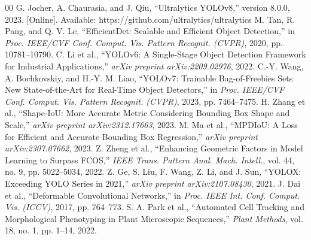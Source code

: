 \documentclass[conference]{IEEEtran}
\begin{document}
\begin{thebibliography}{00}
 G. Jocher, A. Chaurasia, and J. Qiu, ``Ultralytics YOLOv8,'' version 8.0.0, 2023. [Online]. Available: https://github.com/ultralytics/ultralytics
 M. Tan, R. Pang, and Q. V. Le, ``EfficientDet: Scalable and Efficient Object Detection,'' in \textit{Proc. IEEE/CVF Conf. Comput. Vis. Pattern Recognit. (CVPR)}, 2020, pp. 10781--10790.
 C. Li et al., ``YOLOv6: A Single-Stage Object Detection Framework for Industrial Applications,'' \textit{arXiv preprint arXiv:2209.02976}, 2022.
 C.-Y. Wang, A. Bochkovskiy, and H.-Y. M. Liao, ``YOLOv7: Trainable Bag-of-Freebies Sets New State-of-the-Art for Real-Time Object Detectors,'' in \textit{Proc. IEEE/CVF Conf. Comput. Vis. Pattern Recognit. (CVPR)}, 2023, pp. 7464--7475.
 H. Zhang et al., ``Shape-IoU: More Accurate Metric Considering Bounding Box Shape and Scale,'' \textit{arXiv preprint arXiv:2312.17663}, 2023.
 M. Ma et al., ``MPDIoU: A Loss for Efficient and Accurate Bounding Box Regression,'' \textit{arXiv preprint arXiv:2307.07662}, 2023.
 Z. Zheng et al., ``Enhancing Geometric Factors in Model Learning to Surpass FCOS,'' \textit{IEEE Trans. Pattern Anal. Mach. Intell.}, vol. 44, no. 9, pp. 5022--5034, 2022.
 Z. Ge, S. Liu, F. Wang, Z. Li, and J. Sun, ``YOLOX: Exceeding YOLO Series in 2021,'' \textit{arXiv preprint arXiv:2107.08430}, 2021.
 J. Dai et al., ``Deformable Convolutional Networks,'' in \textit{Proc. IEEE Int. Conf. Comput. Vis. (ICCV)}, 2017, pp. 764--773.
 S. A. Park et al., ``Automated Cell Tracking and Morphological Phenotyping in Plant Microscopic Sequences,'' \textit{Plant Methods}, vol. 18, no. 1, pp. 1--14, 2022.
\end{thebibliography}
\end{document}
